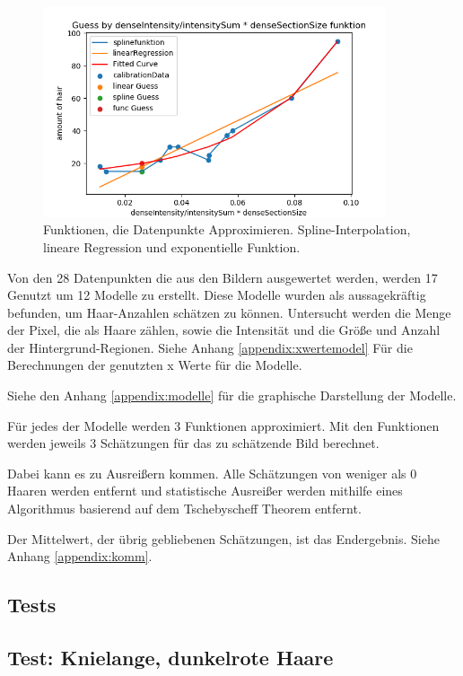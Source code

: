 \documentclass[german,a4paper, 12pt]{llncs}
\begin{document}
\begin{figure}
	\centering
	\includegraphics[width=0.9\textwidth]{fig64/g11_denseIntensitynormDetailed.png}
	\caption[]{Funktionen, die Datenpunkte Approximieren. Spline-Interpolation, lineare Regression und exponentielle Funktion.}
	\label{fig:func}
\end{figure} 

Von den 28 Datenpunkten die aus den Bildern ausgewertet werden, werden 17 Genutzt um 12 Modelle zu erstellt. Diese Modelle wurden als aussagekräftig befunden, um Haar-Anzahlen schätzen zu können. Untersucht werden die Menge der Pixel, die als Haare zählen, sowie die Intensität und die Größe und Anzahl der Hintergrund-Regionen. Siehe Anhang \ref{appendix:xwertemodel} Für die Berechnungen der genutzten x Werte für die Modelle. 

Siehe den Anhang \ref{appendix:modelle} für die graphische Darstellung der Modelle.

Für jedes der Modelle werden 3 Funktionen approximiert. Mit den Funktionen werden jeweils 3 Schätzungen für das zu schätzende Bild berechnet. 

Dabei kann es zu Ausreißern kommen. Alle Schätzungen von weniger als 0 Haaren werden entfernt und statistische Ausreißer werden mithilfe eines Algorithmus basierend auf dem Tschebyscheff Theorem entfernt.\cite{outlierRemoval}

Der Mittelwert, der übrig gebliebenen Schätzungen, ist das Endergebnis. 
Siehe Anhang \ref{appendix:komm}.
\subsection*{Tests}
\subsection{Test: Knielange, dunkelrote Haare}
\end{document}
